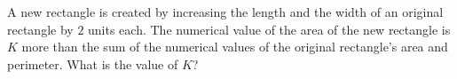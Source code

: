 A new rectangle is created by increasing the length and the width of an original rectangle by $2$ units each. The numerical value of the area of the new rectangle is $K$ more than the sum of the numerical values of the original rectangle's area and perimeter. What is the value of $K$?
